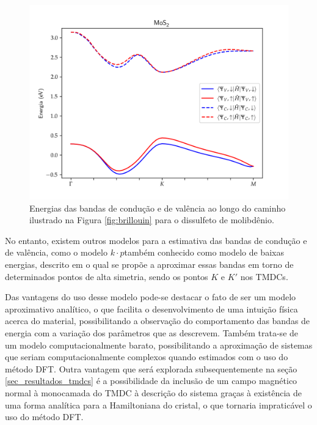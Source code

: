 \begin{figure}[h]
  \centering
  \includegraphics[width=\textwidth]{imagens/mos2_bands.png}
  \caption{
    Energias das bandas de condução e de valência ao longo do caminho ilustrado
    na Figura \ref{fig:brillouin} para o dissulfeto de molibdênio.
  }
  \label{fig:mos2_bands}
\end{figure}

No entanto, existem outros modelos para a estimativa das bandas de condução e de
valência, como o modelo $k \cdot p$\trav também conhecido como modelo de baixas
energias, descrito em \cite{liu2013tmdc}\trav o qual se propõe a aproximar essas
bandas em torno de determinados pontos de alta simetria, sendo os pontos $K$ e $K'$
nos TMDCs.

Das vantagens do uso desse modelo pode-se destacar o fato de ser um modelo
aproximativo analítico, o que facilita o desenvolvimento de uma intuição física
acerca do material, possibilitando a observação do comportamento das bandas de
energia com a variação dos parâmetros que as descrevem. Também trata-se de um
modelo computacionalmente barato, possibilitando a aproximação de sistemas que
seriam computacionalmente complexos quando estimados com o uso do método DFT.
Outra vantagem que será explorada subsequentemente na seção
\ref{sec_resultados_tmdcs} é a possibilidade da inclusão de um campo magnético
normal à monocamada do TMDC à descrição do sistema graças à existência de uma
forma analítica para a Hamiltoniana do cristal, o que tornaria impraticável
o uso do método DFT.

